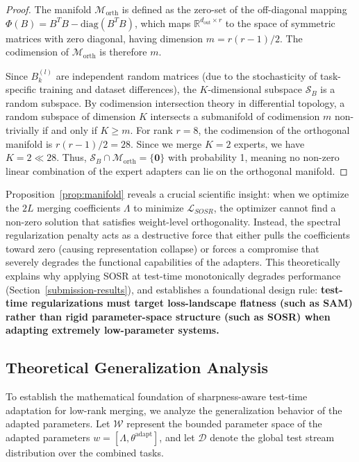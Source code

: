 \documentclass{article}
\theoremstyle{plain}
\theoremstyle{definition}
\theoremstyle{remark}
\begin{document}
\begin{proof}
The manifold $\mathcal{M}_{\text{orth}}$ is defined as the zero-set of the off-diagonal mapping $\Phi(B) = B^T B - \text{diag}(B^T B)$, which maps $\mathbb{R}^{d_{\text{out}} \times r}$ to the space of symmetric matrices with zero diagonal, having dimension $m = r(r-1)/2$. The codimension of $\mathcal{M}_{\text{orth}}$ is therefore $m$. 

Since $B_k^{(l)}$ are independent random matrices (due to the stochasticity of task-specific training and dataset differences), the $K$-dimensional subspace $\mathcal{S}_B$ is a random subspace. By codimension intersection theory in differential topology, a random subspace of dimension $K$ intersects a submanifold of codimension $m$ non-trivially if and only if $K \ge m$. For rank $r = 8$, the codimension of the orthogonal manifold is $r(r-1)/2 = 28$. Since we merge $K = 2$ experts, we have $K = 2 \ll 28$. Thus, $\mathcal{S}_B \cap \mathcal{M}_{\text{orth}} = \{\mathbf{0}\}$ with probability 1, meaning no non-zero linear combination of the expert adapters can lie on the orthogonal manifold.
\end{proof}

Proposition~\ref{prop:manifold} reveals a crucial scientific insight: when we optimize the $2L$ merging coefficients $\Lambda$ to minimize $\mathcal{L}_{SOSR}$, the optimizer cannot find a non-zero solution that satisfies weight-level orthogonality. Instead, the spectral regularization penalty acts as a destructive force that either pulls the coefficients toward zero (causing representation collapse) or forces a compromise that severely degrades the functional capabilities of the adapters. This theoretically explains why applying SOSR at test-time monotonically degrades performance (Section~\ref{submission-results}), and establishes a foundational design rule: \textbf{test-time regularizations must target loss-landscape flatness (such as SAM) rather than rigid parameter-space structure (such as SOSR) when adapting extremely low-parameter systems.}

\subsection{Theoretical Generalization Analysis}
\label{sec:theory}

To establish the mathematical foundation of sharpness-aware test-time adaptation for low-rank merging, we analyze the generalization behavior of the adapted parameters. Let $\mathcal{W}$ represent the bounded parameter space of the adapted parameters $w = [\Lambda, \theta^{\text{adapt}}]$, and let $\mathcal{D}$ denote the global test stream distribution over the combined tasks. 
\end{document}
